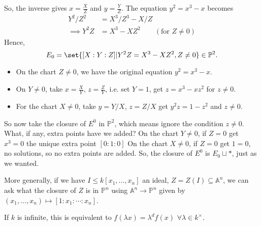\documentclass{article}
\newcommand{\A}{\mathbb{A}}
\newcommand{\proj}{\mathbb{P}}
\begin{document}
So, the inverse gives $x = \frac{X}{Z}$ and $y=\frac{Y}{Z}$.
The equation $y^2 = x^3 - x$ becomes
\begin{align*}
    Y^2/Z^2 &= X^3 / Z^3 - X/Z \\
    \implies Y^2 Z &= X^3 - XZ^2 \qquad (\text{for } Z \neq 0)
\end{align*}
Hence,
\begin{equation*}
E_0 = \set{[X:Y:Z] | Y^2 Z = X^3 - X Z^2, Z \neq 0} \in \proj^2.
\end{equation*}

\begin{itemize}[label=--]
    \item On the chart $Z \neq 0$, we have the original equation $y^2 = x^3 - x$.
    \item On $Y \neq 0$, take $x = \frac{X}{Y}$, $z = \frac{Z}{Y}$, i.e. set $Y=1$, get $z = x^3 - xz^2$ for $z \neq 0$.
    \item For the chart $X \neq 0$, take $y = Y/X$, $z = Z/X$ get $y^2 z = 1 - z^2$ and $z \neq 0$.
\end{itemize}
So now take the closure of $E^0$ in $\proj^2$, which means ignore the condition $z \neq 0$. What, if any, extra points have we added?
On the chart $Y \neq 0$, if $Z = 0$ get $x^3 = 0$ the unique extra point $[0:1:0]$ %
On the chart $X \neq 0$, if $Z=0$ get $1 = 0$, no solutions, so no extra points are added.
So, the closure of $E^0$ is $E_0 \sqcup *$, just as we wanted.

More generally, if we have $I \leq k[x_1, \dotsc, x_n]$ an ideal, $Z = Z(I) \subseteq \A^n$, we can ask what the closure of $Z$ is in $\proj^n$ using $\A^n \to \proj^n$ given by $(x_1, \dotsc, x_n) \mapsto [1:x_1:\dotsm:x_n]$.

If $k$ is infinite, this is equivalent to $f(\lambda x) = \lambda^df(x)$ $\forall \lambda \in k^\times$.
\end{document}
